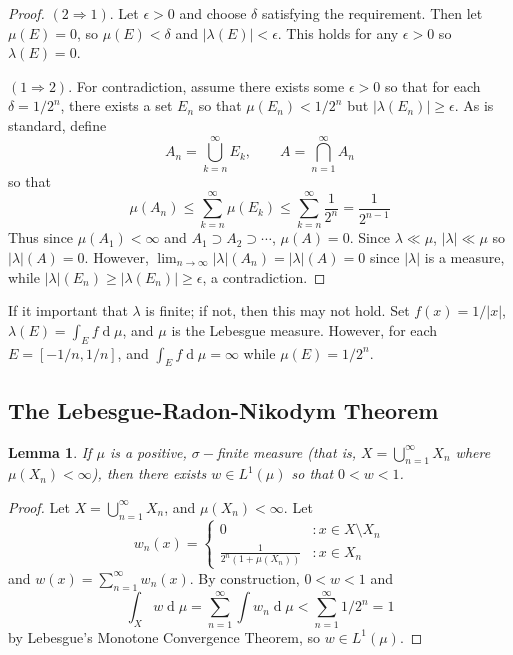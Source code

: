 \documentclass[12pt, a4paper]{book}
\renewcommand{\d}[1]{\ensuremath{\operatorname{d}\!{#1}}} %
\newtheorem{lemma}[theorem]{Lemma}
\theoremstyle{nonumberplain}
\newtheorem{proof}{Proof}
\begin{document}
\begin{proof}
    $(2\Rightarrow 1)$.
    Let $\epsilon>0$ and choose $\delta$ satisfying the requirement.
    Then let $\mu(E)=0$, so $\mu(E)<\delta$ and $|\lambda(E)|<\epsilon$.
    This holds for any $\epsilon>0$ so $\lambda(E)=0$.

    $(1\Rightarrow 2)$.
    For contradiction, assume there exists some $\epsilon>0$ so that for each $\delta=1/2^n$, there exists a set $E_n$ so that $\mu(E_n)<1/2^n$ but $|\lambda(E_n)|\geq\epsilon$.
    As is standard, define
    \begin{equation*}
        A_n=\bigcup\limits_{k=n}^\infty E_k,\qquad A=\bigcap\limits_{n=1}^\infty A_n
    \end{equation*}
    so that
    \begin{equation*}\mu(A_n)\leq\sum\limits_{k=n}^\infty\mu(E_k)\leq\sum\limits_{k=n}^\infty\frac{1}{2^n}=\frac{1}{2^{n-1}}\end{equation*}
    Thus since $\mu(A_1)<\infty$ and $A_1\supset A_2\supset\cdots$, $\mu(A)=0$.
    Since $\lambda\ll\mu$, $|\lambda|\ll\mu$ so $|\lambda|(A)=0$.
    However, $\lim_{n\to\infty}|\lambda|(A_n)=|\lambda|(A)=0$ since $|\lambda|$ is a measure, while $|\lambda|(E_n)\geq|\lambda(E_n)|\geq\epsilon$, a contradiction.
\end{proof}
If it important that $\lambda$ is finite; if not, then this may not hold.
Set $f(x)=1/|x|$, $\lambda(E)=\int_Ef\d{\mu}$, and $\mu$ is the Lebesgue measure.
However, for each $E=[-1/n,1/n]$, and $\int_Ef\d{\mu}=\infty$ while $\mu(E)=1/2^n$.
\subsection{The Lebesgue-Radon-Nikodym Theorem}
\begin{lemma}
    If $\mu$ is a positive, $\sigma-$finite measure (that is, $X=\bigcup_{n=1}^\infty X_n$ where $\mu(X_n)<\infty$), then there exists $w\in L^1(\mu)$ so that $0<w<1$.
\end{lemma}
\begin{proof}
    Let $X=\bigcup\limits_{n=1}^\infty X_n$, and $\mu(X_n)<\infty$.
    Let
    \[w_n(x)=
        \begin{cases}
            0 &:x\in X\setminus X_n\\
            \frac{1}{2^n(1+\mu(X_n))} &: x\in X_n
        \end{cases}
    \]
    and $w(x)=\sum_{n=1}^\infty w_n(x)$.
    By construction, $0<w<1$ and
    \[\int_X w\d{\mu}=\sum\limits_{n=1}^\infty\int w_n\d{\mu}<\sum\limits_{n=1}^\infty 1/2^n=1\]
    by Lebesgue's Monotone Convergence Theorem, so $w\in L^1(\mu)$.
\end{proof}
\end{document}
